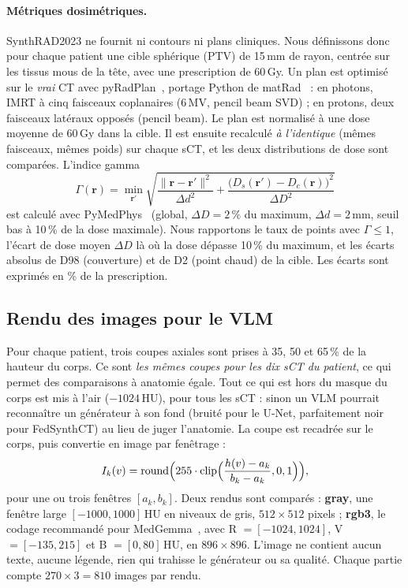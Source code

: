 \documentclass[11pt,a4paper]{article}
\begin{document}
\paragraph{Métriques dosimétriques.} SynthRAD2023 ne fournit ni contours ni plans cliniques. Nous définissons donc pour chaque patient une cible sphérique (PTV) de 15\,mm de rayon, centrée sur les tissus mous de la tête, avec une prescription de 60\,Gy. Un plan est optimisé sur le \emph{vrai} CT avec pyRadPlan~\cite{pyradplan}, portage Python de matRad~\cite{wieser2017matrad} : en photons, IMRT à cinq faisceaux coplanaires (6\,MV, pencil beam SVD) ; en protons, deux faisceaux latéraux opposés (pencil beam). Le plan est normalisé à une dose moyenne de 60\,Gy dans la cible. Il est ensuite recalculé \emph{à l'identique} (mêmes faisceaux, mêmes poids) sur chaque sCT, et les deux distributions de dose sont comparées. L'indice gamma~\cite{low1998gamma}
\begin{equation}
\Gamma(\mathbf{r}) = \min_{\mathbf{r}'}\sqrt{\frac{\lVert\mathbf{r}-\mathbf{r}'\rVert^2}{\Delta d^2}+\frac{\bigl(D_s(\mathbf{r}')-D_c(\mathbf{r})\bigr)^2}{\Delta D^2}}
\end{equation}
est calculé avec PyMedPhys~\cite{pymedphys} (global, $\Delta D = 2\,\%$ du maximum, $\Delta d = 2$\,mm, seuil bas à 10\,\% de la dose maximale). Nous rapportons le taux de points avec $\Gamma \le 1$, l'écart de dose moyen $\Delta D$ là où la dose dépasse 10\,\% du maximum, et les écarts absolus de D98 (couverture) et de D2 (point chaud) de la cible. Les écarts sont exprimés en \% de la prescription.

\subsection{Rendu des images pour le VLM}
\label{sec:rendu}
Pour chaque patient, trois coupes axiales sont prises à 35, 50 et 65\,\% de la hauteur du corps. Ce sont \emph{les mêmes coupes pour les dix sCT du patient}, ce qui permet des comparaisons à anatomie égale. Tout ce qui est hors du masque du corps est mis à l'air ($-1024$\,HU), pour tous les sCT : sinon un VLM pourrait reconnaître un générateur à son fond (bruité pour le U-Net, parfaitement noir pour FedSynthCT) au lieu de juger l'anatomie. La coupe est recadrée sur le corps, puis convertie en image par fenêtrage :
\begin{equation}
I_k(v) = \operatorname{round}\Bigl(255\cdot\operatorname{clip}\Bigl(\frac{h(v)-a_k}{b_k-a_k},0,1\Bigr)\Bigr),
\end{equation}
pour une ou trois fenêtres $[a_k, b_k]$. Deux rendus sont comparés : \textbf{gray}, une fenêtre large $[-1000, 1000]$\,HU en niveaux de gris, $512\times512$ pixels ; \textbf{rgb3}, le codage recommandé pour MedGemma~\cite{medgemma15}, avec R $=[-1024,1024]$, V $=[-135,215]$ et B $=[0,80]$\,HU, en $896\times896$. L'image ne contient aucun texte, aucune légende, rien qui trahisse le générateur ou sa qualité. Chaque partie compte $270 \times 3 = 810$ images par rendu.
\end{document}
